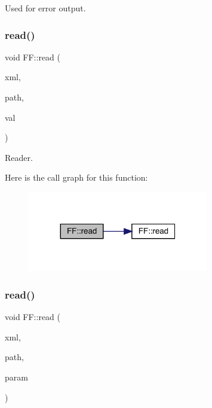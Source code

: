 Used for error output. 

\mbox{\label{namespaceFF_a951fc6aa6ba4be7a0eb44c600fce48f0}} 
\subsubsection{\texorpdfstring{read()}{read()}\hspace{0.1cm}{\footnotesize\ttfamily [1/15]}}
{\footnotesize\ttfamily void F\+F\+::read (\begin{DoxyParamCaption}\item[{X\+M\+L\+Reader \&}]{xml,  }\item[{const std\+::string \&}]{path,  }\item[{\mbox{\hyperlink{structFF_1_1PiPf}{Pi\+Pf}} \&}]{val }\end{DoxyParamCaption})}



Reader. 

Here is the call graph for this function\+:\nopagebreak
\begin{figure}[H]
\begin{center}
\leavevmode
\includegraphics[width=224pt]{d5/da6/namespaceFF_a951fc6aa6ba4be7a0eb44c600fce48f0_cgraph}
\end{center}
\end{figure}
\mbox{\label{namespaceFF_acb4db5dbe27937736b4f2cbed9694c56}} 
\subsubsection{\texorpdfstring{read()}{read()}\hspace{0.1cm}{\footnotesize\ttfamily [2/15]}}
{\footnotesize\ttfamily void F\+F\+::read (\begin{DoxyParamCaption}\item[{X\+M\+L\+Reader \&}]{xml,  }\item[{const std\+::string \&}]{path,  }\item[{\mbox{\hyperlink{structFF_1_1KeyHadron1PtCorr__t}{Key\+Hadron1\+Pt\+Corr\+\_\+t}} \&}]{param }\end{DoxyParamCaption})}



